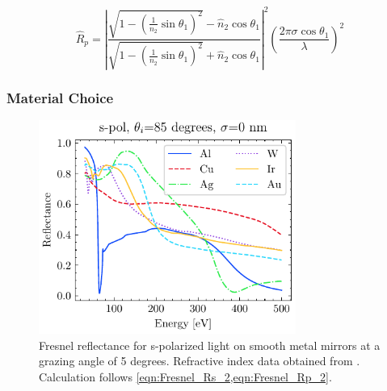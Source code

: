 \begin{equation}
\hat{R}_p = \left| \frac{\sqrt{1-\left(\frac{1}{n_2}\sin \theta_1\right)^2} - \hat{n}_2 \cos \theta_1}{\sqrt{1-\left(\frac{1}{n_2}\sin \theta_1\right)^2} + \hat{n}_2 \cos \theta_1} \right|^2 \left( \frac{2 \pi \sigma \cos \theta_1}{\lambda} \right)^2
\label{eqn:Fresnel_Rp_3}
\end{equation}



%




\subsubsection{Material Choice}
\begin{figure}
	\centering
	\includegraphics[width=0.75\textwidth]{figures/chap2/Fresnel_NoSigma.pdf}
	\caption{Fresnel reflectance for s-polarized light on smooth metal mirrors at a grazing angle of 5 degrees. Refractive index data obtained from \cite{gulliksonCXROXRayInteractions,henkeXRayInteractionsPhotoabsorption1993}. Calculation follows \cref{eqn:Fresnel_Rs_2,eqn:Fresnel_Rp_2}.}
	\label{fig:Mirror_Material_Choice}
\end{figure}

